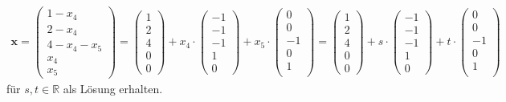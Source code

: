 \begin{align*}
\textbf{x}
=
\begin{pmatrix}
1-x_4\\
2 -x_4\\
4 - x_4 -x_5\\
x_4\\
x_5
\end{pmatrix}
= 
\begin{pmatrix}
1\\
2\\
4\\
0\\
0
\end{pmatrix}
+
x_4 \cdot
\begin{pmatrix}
-1\\
-1\\
-1\\
1\\
0
\end{pmatrix}
+
x_5
\cdot 
\begin{pmatrix}
0\\
0\\
-1\\
0\\
1\\
\end{pmatrix}
=
\begin{pmatrix}
1\\
2\\
4\\
0\\
0
\end{pmatrix}
+
s \cdot
\begin{pmatrix}
-1\\
-1\\
-1\\
1\\
0
\end{pmatrix}
+
t
\cdot  
\begin{pmatrix}
0\\
0\\
-1\\
0\\
1\\
\end{pmatrix}
\end{align*}
für $s,t \in \mathbb{R}$ als Lösung erhalten.
\newpage

